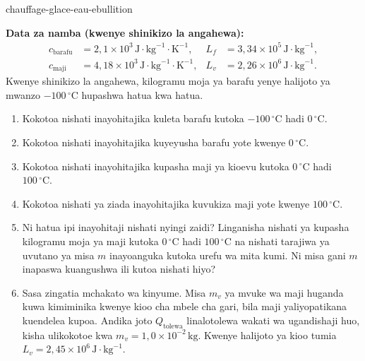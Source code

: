 
\begin{exo}{chauffage-glace-eau-ebullition}

\textbf{Data za namba (kwenye shinikizo la angahewa):}
\[
\begin{aligned}
c_{\text{barafu}} &= 2{,}1\times10^3\,\text{J}\!\cdot\!\text{kg}^{-1}\!\cdot\!\text{K}^{-1},
& L_f &= 3{,}34\times10^5\,\text{J}\!\cdot\!\text{kg}^{-1},\\
c_{\text{maji}} &= 4{,}18\times10^3\,\text{J}\!\cdot\!\text{kg}^{-1}\!\cdot\!\text{K}^{-1},
& L_v &= 2{,}26\times10^6\,\text{J}\!\cdot\!\text{kg}^{-1}.
\end{aligned}
\]
Kwenye shinikizo la angahewa, kilogramu moja ya barafu yenye halijoto ya mwanzo $-100\,{}^\circ\text{C}$ hupashwa hatua kwa hatua.

\begin{enumerate}
  \item Kokotoa nishati inayohitajika kuleta barafu kutoka $-100\,{}^\circ\text{C}$ hadi $0\,{}^\circ\text{C}$.
  \item Kokotoa nishati inayohitajika kuyeyusha barafu yote kwenye $0\,{}^\circ\text{C}$.
  \item Kokotoa nishati inayohitajika kupasha maji ya kioevu kutoka $0\,{}^\circ\text{C}$ hadi $100\,{}^\circ\text{C}$.
  \item Kokotoa nishati ya ziada inayohitajika kuvukiza maji yote kwenye $100\,{}^\circ\text{C}$.
  \item Ni hatua ipi inayohitaji nishati nyingi zaidi? Linganisha nishati ya kupasha kilogramu moja ya maji kutoka $0\,{}^\circ\text{C}$ hadi $100\,{}^\circ\text{C}$ na nishati tarajiwa ya uvutano ya misa $m$ inayoanguka kutoka urefu wa mita kumi. Ni misa gani $m$ inapaswa kuangushwa ili kutoa nishati hiyo?
  \item Sasa zingatia mchakato wa kinyume. Misa $m_v$ ya mvuke wa maji huganda kuwa kimiminika kwenye kioo cha mbele cha gari, bila maji yaliyopatikana kuendelea kupoa. Andika joto $Q_{\text{tolewa}}$ linalotolewa wakati wa ugandishaji huo, kisha ulikokotoe kwa $m_v=1{,}0\times10^{-2}\,\text{kg}$. Kwenye halijoto ya kioo tumia $L_v=2{,}45\times10^6\,\text{J}\!\cdot\!\text{kg}^{-1}$.
\end{enumerate}


\end{exo}
